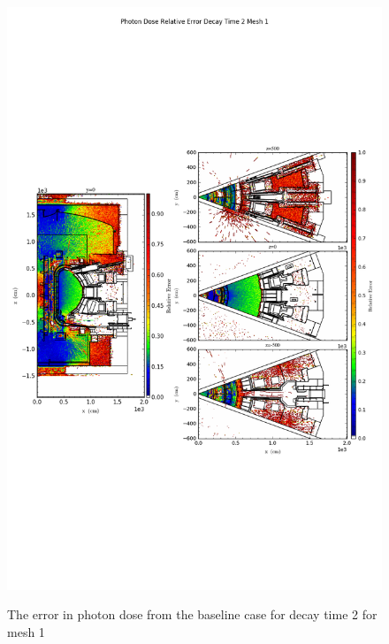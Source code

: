\begin{figure}[ht!]
\centering
\includegraphics[trim={0cm 9cm 0cm 10cm},clip,scale=0.75]{../plots/final_model_nob4c/Photon_Dose_Relative_Error_Decay_Time_2_Mesh_1.png}
\label{fig:photons_dc2_no4bc_m1_error}
\caption{The error in photon dose from the baseline case for decay time 2 for mesh 1}
\end{figure}
